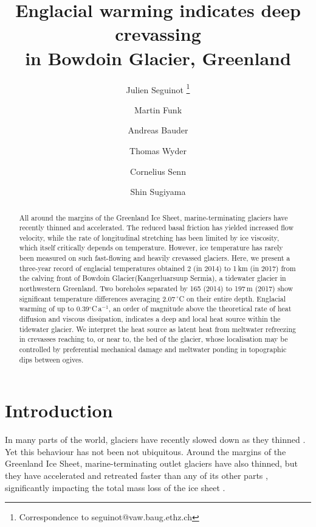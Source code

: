 \documentclass[utf8]{article}
\title{Englacial warming indicates deep crevassing\\
       in Bowdoin Glacier, Greenland}
\author[1]{Julien Seguinot
           \thanks{Correspondence to seguinot@vaw.baug.ethz.ch}}
\author[1]{Martin Funk}
\author[1]{Andreas Bauder}
\author[1]{Thomas Wyder}
\author[2]{Cornelius Senn}
\author[3]{Shin Sugiyama}
\affil[1]{Laboratory of Hydraulics, Hydrology and Glaciology,
          ETH Zürich, Switzerland}
\affil[2]{Department of Civil, Environmental and Geomatic Engineering,
          ETH Zürich, Switzerland}
\affil[3]{Institute of Low Temperature Science, Hokkaido University,
          Sapporo, Japan}
\begin{document}

\maketitle

\begin{abstract}

    All around the margins of the Greenland Ice Sheet, marine-terminating
    glaciers have recently thinned and accelerated. The reduced basal friction
    has yielded increased flow velocity, while the rate of longitudinal
    stretching has been limited by ice viscosity, which itself critically
    depends on temperature. However, ice temperature has rarely been measured
    on such fast-flowing and heavily crevassed glaciers.
    Here, we present a three-year record of englacial temperatures obtained
    2 (in 2014) to 1\,km (in 2017) from the calving front of Bowdoin
    Glacier(Kangerluarsuup Sermia), a
    tidewater glacier in northwestern Greenland. Two boreholes separated by 165
    (2014) to 197\,m (2017) show significant temperature differences averaging
    2.07\,$^\circ$C on their entire depth. Englacial warming of up to
    0.39$^\circ$C\,a$^{-1}$, an order of magnitude above the theoretical rate
    of heat diffusion and viscous dissipation, indicates a deep and local heat
    source within the tidewater glacier.
    We interpret the heat source as latent heat from meltwater refreezing in
    crevasses reaching to, or near to, the bed of the glacier, whose localisation
    may be controlled by preferential mechanical damage and meltwater ponding
    in topographic dips between ogives.

\end{abstract}

\section{Introduction}

    In many parts of the world, glaciers have recently slowed down as they
    thinned \citep{Heid.Kaab.2012, Dehecq.etal.2018}. Yet this behaviour has
    not been not ubiquitous. Around the margins of the Greenland Ice Sheet,
    marine-terminating outlet glaciers have also thinned, but they have
    accelerated and retreated faster than any of its other parts
    \citep[e.g.,][]{Krabill.etal.2000, Rignot.Kanagaratnam.2006,
    Pritchard.etal.2009, Moon.etal.2012, Moon.etal.2015, Hill.etal.2017},
    significantly impacting the total
    mass loss of the ice sheet \citep[e.g.,][]{Enderlin.etal.2014,
    Khan.etal.2015, McMillan.etal.2016}.
\end{document}
